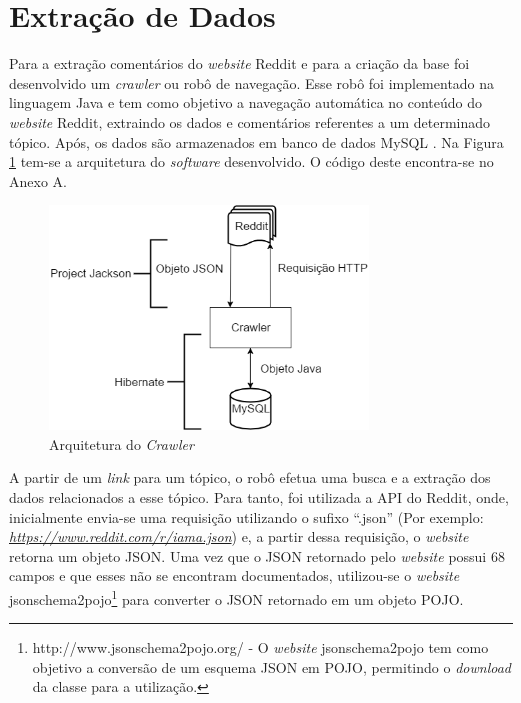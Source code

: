 \section{Extração de Dados}
\label{cap:Extracao}

Para a extração comentários do \textit{website} Reddit e para a criação da base
foi desenvolvido um \textit{crawler} ou robô de navegação. Esse robô foi
implementado na linguagem Java e tem como objetivo a navegação automática no
conteúdo do \textit{website} Reddit, extraindo os dados e comentários referentes a um
determinado tópico. Após, os dados são armazenados em banco de dados MySQL
\cite{Widenius:2002:MRM:560480}.
Na Figura \ref{fig:crawler} tem-se a arquitetura do \textit{software}
desenvolvido. O código deste encontra-se no Anexo A.

\newpage

\begin{figure}[htbp]
\centering
\includegraphics[height=225px]{imagens/arquitetura.png}
\caption{Arquitetura do \textit{Crawler}}
\label{fig:crawler}
\end{figure}

A partir de um \textit{link} para um tópico, o robô efetua uma busca e a
extração dos dados relacionados a esse tópico. Para tanto, foi utilizada a
\ac{API} do Reddit, onde, inicialmente envia-se uma requisição utilizando o
sufixo ``.json'' (Por exemplo:
\textit{\url{https://www.reddit.com/r/iama.json}}) e, a partir dessa requisição,
o \textit{website} retorna um objeto \ac{JSON}. Uma vez que o \ac{JSON}
retornado pelo \textit{website} possui 68 campos e que esses não se encontram
documentados, utilizou-se o \textit{website}
jsonschema2pojo\footnote{http://www.jsonschema2pojo.org/ - O \textit{website}
jsonschema2pojo tem como objetivo a conversão de um esquema \ac{JSON} em \ac{POJO}, permitindo o
\textit{download} da classe para a utilização.} para converter o
JSON retornado em um objeto \ac{POJO}.

